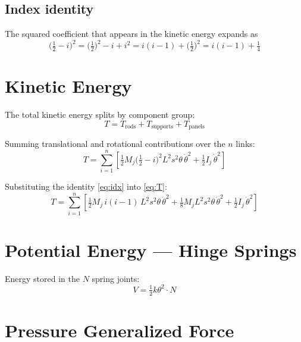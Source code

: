 \documentclass[11pt]{article}
\newcommand{\dth}{\dot{\theta}}
\begin{document}
\subsection*{Index identity}

The squared coefficient that appears in the kinetic energy expands as
\begin{equation}
\Big(\tfrac{1}{2}-i\Big)^{2}
= \Big(\tfrac{1}{2}\Big)^{2} - i + i^{2}
= i(i-1) + \Big(\tfrac{1}{2}\Big)^{2}
= i(i-1) + \tfrac{1}{4}
\label{eq:idx}
\end{equation}

\section{Kinetic Energy}

The total kinetic energy splits by component group:
\begin{equation}
T = T_{\text{rods}} + T_{\text{supports}} + T_{\text{panels}}
\end{equation}

Summing translational and rotational contributions over the $n$ links:
\begin{equation}
T = \sum_{i=1}^{n}
\left[
\tfrac{1}{2}M_j\Big(\tfrac{1}{2}-i\Big)^{2}L^{2}s^{2}\theta\,\dth^{2}
+ \tfrac{1}{2}I_j\,\dth^{2}
\right]
\label{eq:T}
\end{equation}

Substituting the identity \eqref{eq:idx} into \eqref{eq:T}:
\begin{equation}
T = \sum_{i=1}^{n}
\left[
\tfrac{1}{2}M_j\,i(i-1)\,L^{2}s^{2}\theta\,\dth^{2}
+ \tfrac{1}{8}M_j L^{2}s^{2}\theta\,\dth^{2}
+ \tfrac{1}{2}I_j\,\dth^{2}
\right]
\label{eq:Texp}
\end{equation}

\section{Potential Energy — Hinge Springs}

Energy stored in the $N$ spring joints:
\begin{equation}
V = \tfrac{1}{2}k\theta^{2}\cdot N
\end{equation}



\section{Pressure Generalized Force}
\end{document}
